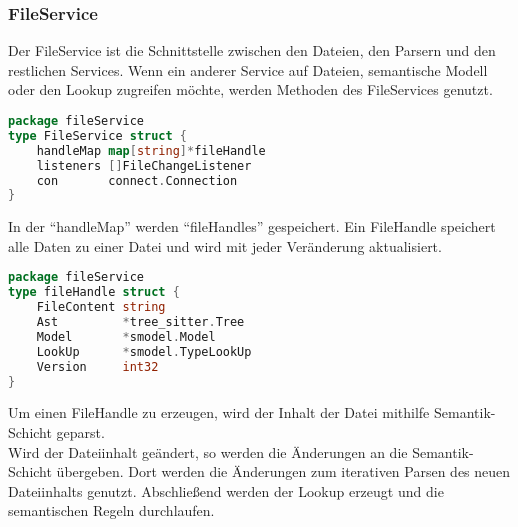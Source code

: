 \documentclass[./einleitung.tex]{subfiles}
\begin{document}
    \subsubsection{FileService}\label{subsubsec:file-service}
    Der FileService ist die Schnittstelle zwischen den Dateien, den Parsern und den restlichen Services.
    Wenn ein anderer Service auf Dateien, semantische Modell oder den Lookup zugreifen möchte, werden Methoden des FileServices genutzt.
    \begin{lstlisting}[language=Go]
package fileService
type FileService struct {
	handleMap map[string]*fileHandle
	listeners []FileChangeListener
	con       connect.Connection
}
    \end{lstlisting}
    In der ``handleMap'' werden ``fileHandles'' gespeichert.
    Ein FileHandle speichert alle Daten zu einer Datei und wird mit jeder Veränderung aktualisiert.
    \begin{lstlisting}[language=Go]
package fileService
type fileHandle struct {
	FileContent string
	Ast         *tree_sitter.Tree
	Model       *smodel.Model
	LookUp      *smodel.TypeLookUp
	Version     int32
}
    \end{lstlisting}
    Um einen FileHandle zu erzeugen, wird der Inhalt der Datei mithilfe Semantik-Schicht geparst.\\
    Wird der Dateiinhalt geändert, so werden die Änderungen an die Semantik-Schicht übergeben.
    Dort werden die Änderungen zum iterativen Parsen des neuen Dateiinhalts genutzt.
    Abschließend werden der Lookup erzeugt und die semantischen Regeln durchlaufen. \\
\end{document}
